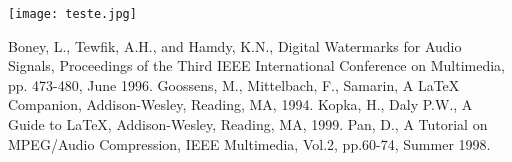 \documentclass[a4paper,10pt]{article}
\begin{document}
 \texttt{[image: teste.jpg]}


\begin{thebibliography}
     Boney, L., Tewfik, A.H., and Hamdy, K.N., Digital 
        Watermarks for Audio Signals, Proceedings of the Third IEEE
        International Conference on Multimedia, pp. 473-480, June 1996.
     Goossens, M., Mittelbach, F., Samarin, A LaTeX Companion, Addison-Wesley, Reading, MA, 1994.
     Kopka, H., Daly P.W., A Guide to LaTeX, Addison-Wesley, Reading, MA, 1999.
     Pan, D., A Tutorial on MPEG/Audio Compression, IEEE Multimedia, Vol.2, pp.60-74, Summer 1998.
\end{thebibliography}
\end{document}

